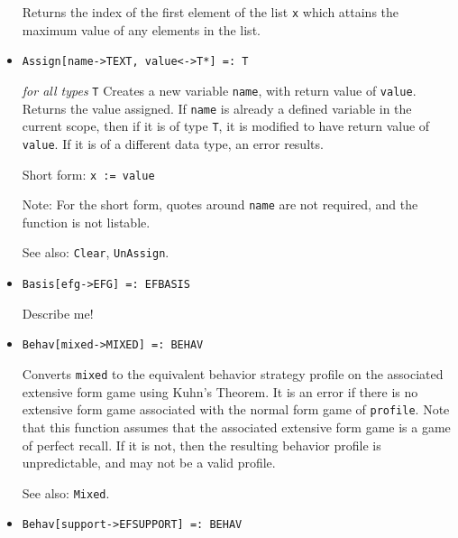 \begin{itemize}
\bd 
Returns the index of the first element of the list \verb+x+ which
attains the maximum value of any elements in the list.  
\ed

\item{} 
\protect \large \begin{verbatim}
Assign[name->TEXT, value<->T*] =: T
\end{verbatim} \normalsize

{\it for all types} {\tt T} 
\bd 
Creates a new variable \verb+name+, with return value of \verb+value+.
Returns the value assigned.  If \verb+name+ is already a defined
variable in the current scope, then if it is of type \verb+T+, it is
modified to have return value of \verb+value+.  If it is of a
different data type, an error results.
 
\item [Short form:] \verb+x := value+
\item [Note:] For the short form, quotes around \verb+name+ are not
required, and the function is not listable.
\item [See also:] \verb+Clear+, \verb+UnAssign+.
\ed


\item{}
\protect \large \begin{verbatim}
Basis[efg->EFG] =: EFBASIS
\end{verbatim}\normalsize

\bd
Describe me!
\ed

\item{}
\protect \large \begin{verbatim}
Behav[mixed->MIXED] =: BEHAV 
\end{verbatim}\normalsize

\bd 
Converts \verb+mixed+ to the equivalent behavior strategy profile on
the associated extensive form game using Kuhn's Theorem.  It is an
error if there is no extensive form game associated with the normal
form game of \verb+profile+.  Note that this function assumes that the
associated extensive form game is a game of perfect recall.  If it is
not, then the resulting behavior profile is unpredictable, and may not
be a valid profile.
\item [See also:] \verb+Mixed+.
\ed

\item{}
\protect \large \begin{verbatim}
Behav[support->EFSUPPORT] =: BEHAV 
\end{verbatim}\normalsize


\end{itemize}
